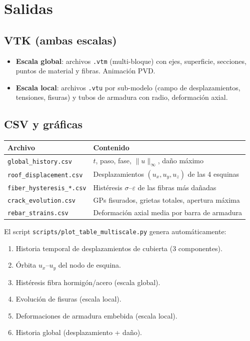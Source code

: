 \section{Salidas}

\subsection{VTK (ambas escalas)}

\begin{itemize}
  \item \textbf{Escala global}: archivos \texttt{.vtm} (multi-bloque) con
        ejes, superficie, secciones, puntos de material y fibras.
        Animación PVD.
  \item \textbf{Escala local}: archivos \texttt{.vtu} por sub-modelo
        (campo de desplazamientos, tensiones, fisuras) y tubos de armadura
        con radio, deformación axial.
\end{itemize}

\subsection{CSV y gráficas}

\begin{center}
\begin{tabular}{ll}
\toprule
Archivo & Contenido \\
\midrule
\texttt{global\_history.csv}   & $t$, paso, fase, $\|u\|_\infty$, daño máximo \\
\texttt{roof\_displacement.csv}& Desplazamientos $(u_x,u_y,u_z)$ de las 4 esquinas \\
\texttt{fiber\_hysteresis\_*.csv}& Histéresis $\sigma$--$\varepsilon$ de las fibras más dañadas \\
\texttt{crack\_evolution.csv}  & GPs fisurados, grietas totales, apertura máxima \\
\texttt{rebar\_strains.csv}    & Deformación axial media por barra de armadura \\
\bottomrule
\end{tabular}
\end{center}

El script \texttt{scripts/plot\_table\_multiscale.py} genera automáticamente:
\begin{enumerate}
  \item Historia temporal de desplazamientos de cubierta (3 componentes).
  \item Órbita $u_x$--$u_y$ del nodo de esquina.
  \item Histéresis fibra hormigón/acero (escala global).
  \item Evolución de fisuras (escala local).
  \item Deformaciones de armadura embebida (escala local).
  \item Historia global (desplazamiento + daño).
\end{enumerate}

